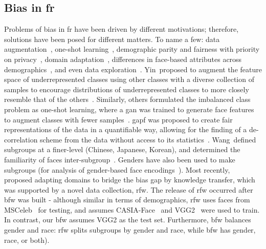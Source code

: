     \subsection{Bias in \gls{fr}}
        Problems of bias in \gls{fr} have been driven by different motivations; therefore, solutions have been posed for different matters. To name a few: data augmentation~\cite{yin2019feature}, one-shot learning~\cite{ding2018one}, demographic parity and fairness with priority on privacy~\cite{huang2018generative}, domain adaptation~\cite{wang2018racial}, differences in face-based attributes across demographics~\cite{wang2018they}, and even data exploration~\cite{muthukumar2019}. Yin~\etal proposed to augment the feature space of underrepresented classes using other classes with a diverse collection of samples to encourage distributions of underrepresented classes to more closely resemble that of the others~\cite{yin2019feature}. Similarly, others formulated the imbalanced class problem as one-shot learning, where a \gls{gan} was trained to generate face features to augment classes with fewer samples~\cite{ding2018one}. \gls{gapf} was proposed to create fair representations of the data in a quantifiable way, allowing for the finding of a de-correlation scheme from the data without access to its statistics~\cite{huang2018generative}. Wang~\etal defined subgroups at a finer-level (\ie Chinese, Japanese, Korean), and determined the familiarity of faces inter-subgroup~\cite{wang2018they}. Genders have also been used to make subgroups (\eg for analysis of gender-based face encodings~\cite{muthukumar2019}). Most recently,~\cite{wang2018racial} proposed adapting domains to bridge the bias gap by knowledge transfer, which was supported by a novel data collection, \gls{rfw}. The release of \gls{rfw} occurred after \gls{bfw} was built - although similar in terms of demographics, \gls{rfw} uses faces from MSCeleb~\cite{guo2016ms} for testing, and assumes CASIA-Face~\cite{yi2014learning} and VGG2~\cite{Cao18} were used to train. In contrast, our \gls{bfw} assumes VGG2 as the test set. 
        Furthermore, \gls{bfw} balances gender and race: \gls{rfw} splits subgroups by gender and race, while \gls{bfw} has gender, race, or both). 


